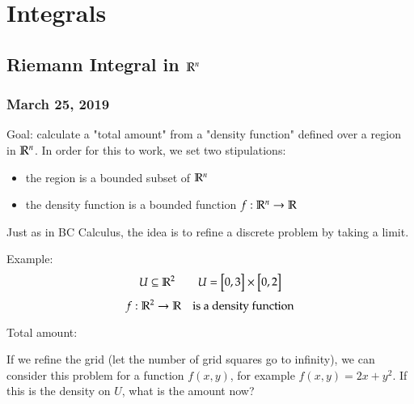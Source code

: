 \section{Integrals}
\subsection{Riemann Integral in $\mathbb{R}^n$}
\subsubsection*{March 25, 2019}
Goal: calculate a "total amount" from a "density function" defined over a region in $\mathbb{R}^n$. In order for this to work, we set two stipulations: 
\begin{itemize}
	\item the region is a bounded subset of $\mathbb{R}^n$
	\item the density function is a bounded function $f : \mathbb{R}^n \to \mathbb{R}$
\end{itemize}
Just as in BC Calculus, the idea is to refine a discrete problem by taking a limit. 

Example: 
\[U \subseteq \mathbb{R}^2\qquad U = \begin{bmatrix} 0,3 \end{bmatrix}\times \begin{bmatrix} 0,2 \end{bmatrix}\]
\[f : \mathbb{R}^2 \to \mathbb{R} \quad \text{is a density function}\]
\begin{center}

Total amount: 
\end{center}

If we refine the grid (let the number of grid squares go to infinity), we can consider this problem for a function $f(x,y)$, for example $f(x,y)=2x+y^2$. If this is the density on $U$, what is the amount now? 

